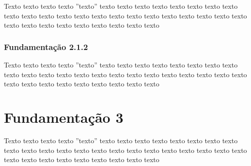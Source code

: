 Texto texto texto texto ''texto'' texto texto texto texto texto texto texto texto texto texto texto texto texto texto texto texto texto texto texto texto texto texto texto texto texto texto texto texto texto texto texto

\subsubsection{Fundamentação 2.1.2}
\label{subsub:outrasubsubsection2a}

Texto texto texto texto ''texto'' texto texto texto texto texto texto texto texto texto texto texto texto texto texto texto texto texto texto texto texto texto texto texto texto texto texto texto texto texto texto texto




\section{Fundamentação 3}
\label{sec:section3}

Texto texto texto texto ''texto'' texto texto texto texto texto texto texto texto texto texto texto texto texto texto texto texto texto texto texto texto texto texto texto texto texto texto texto texto texto texto texto